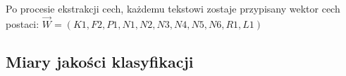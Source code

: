 \documentclass{classrep}
\begin{document}
Po procesie ekstrakcji cech, każdemu tekstowi zostaje przypisany wektor cech postaci:
$\vec{W} = (K1, F2, P1, N1, N2, N3, N4, N5, N6, R1, L1)$

\subsection{Miary jakości klasyfikacji}
\end{document}
